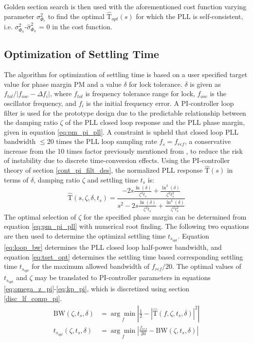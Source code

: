Golden section search is then used with the aforementioned cost function varying parameter $\sigma^2_{\Phi_e}$ to find the optimal $\hat{\mathrm{T}}_{opt}(s)$ for which the PLL is self-consistent, i.e. $\sigma^2_{\Phi_n}$-$\hat{\sigma}^2_{\Phi_n}$ = 0 in the cost function. 

\subsection{Optimization of Settling Time}
The algorithm  for optimization of settling time is based on a user specified target value for phase margin PM and a value $\delta$ for lock tolerance. $\delta$ is given as $f_{tol}/|f_{osc}-\Delta f_i|$, where $f_{tol}$ is frequency tolerance range for lock, $f_{osc}$ is the oscillator frequency, and $f_i$ is the initial frequency error. A PI-controller loop filter is used for the prototype design due to the predictable relationship between the damping ratio $\zeta$ of the PLL closed loop response and the PLL phase margin, given in equation \ref{eq:pm_pi_pll}. A constraint is upheld that closed loop PLL bandwidth $\leq 20$ times the PLL loop sampling rate $f_s=f_{ref}$, a conservative increase from the 10 times factor previously mentioned from \cite{gardner_1980}, to reduce the risk of instability due to discrete time-conversion effects. Using the PI-controller theory of section \ref{cont_pi_filt_des}, the normalized PLL response $\hat{\mathrm{T}}(s)$ in terms of $\delta$, damping ratio $\zeta$ and settling time $t_s$ is:
\begin{equation}
\hat{\mathrm{T}}(s, \zeta, \delta, t_s) = \frac{-2s\frac{\ln(\delta)}{\zeta^2t_s}+\frac{\ln^2(\delta)}{\zeta^2t^2_s}}{s^2-2s\frac{\ln(\delta)}{\zeta^2t_s}+\frac{\ln^2(\delta)}{\zeta^2t^2_s}}
\end{equation}
The optimal selection of $\zeta$ for the specified phase margin can be determined from equation \ref{eq:pm_pi_pll} with numerical root finding. The following two equations are then used to determine the optimizal settling time $t_{s_{opt}}$. Equation \ref{eq:loop_bw} determines the PLL closed loop half-power bandwidth, and equation \ref{eq:tset_opt} determines the settling time based corresponding settling time $t_{s_{opt}}$ for the maximum allowed bandwidth of $f_{ref}/20$. The optimal values of $t_{s_{opt}}$ and $\zeta$ may be translated to PI-controller parameters in equations \ref{eq:omega_z_pi}-\ref{eq:kp_pi}, which is discretized using section \ref{disc_lf_comp_pi}.
\begin{align}
\text{BW}(\zeta, t_s, \delta) &= \underset{f}{\arg\min}\left|\frac{1}{2}-\left|\hat{\mathrm{T}}(f,\zeta, t_s, \delta)\right|^2\right|\label{eq:loop_bw}\\
t_{s_{opt}}(\zeta, t_s, \delta) &= \underset{f}{\arg\min}\left|\frac{f_{ref}}{20}-\text{BW}(\zeta, t_s, \delta)\right|\label{eq:tset_opt}
\end{align}


